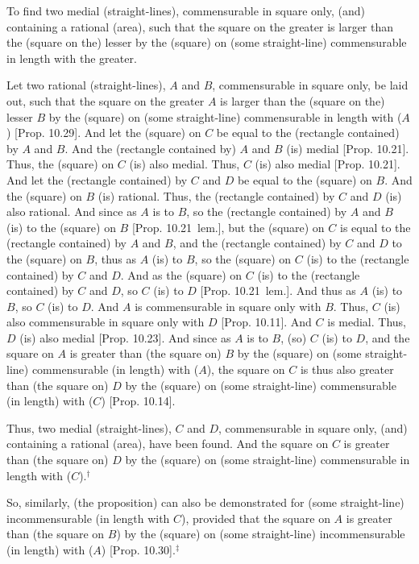 \begin{Parallel}{}{}
{To find two medial (straight-lines),
commensurable in square only, (and) containing a rational (area), such that
the square on the greater is larger than the (square on the) lesser by the
(square) on (some straight-line) commensurable in length with the greater.

\epsfysize=1.6in
\centerline{}

Let two rational (straight-lines), $A$ and $B$, commensurable in square only, 
be laid out, such that the square on the greater $A$ is larger than the (square on
the) lesser $B$ by the (square) on (some straight-line) commensurable
in length with ($A$) [Prop. 10.29]. And let the
(square) on $C$ be equal to the (rectangle contained) by $A$ and $B$.
And the (rectangle contained by) $A$ and $B$ (is) medial [Prop. 10.21]. Thus, the (square) on $C$ (is)
also medial. Thus, $C$ (is) also medial [Prop. 10.21]. And let the (rectangle contained) by $C$ and $D$
be equal to the (square) on $B$. And the (square)
on $B$ (is) rational. Thus, the (rectangle contained) by $C$ and $D$ (is)
also rational. And since as $A$ is to $B$, so the (rectangle contained) by
$A$ and $B$ (is) to the (square) on $B$ [Prop. 10.21~lem.], but the (square) on $C$
is equal to the (rectangle contained) by $A$ and $B$,  
and the (rectangle contained) by $C$ and $D$ to the (square) on
$B$, thus as $A$ (is) to $B$,
so the (square) on $C$ (is) to the (rectangle contained) by $C$ and $D$.
And as the (square) on $C$ (is) to the (rectangle contained) by $C$ and $D$,
so $C$ (is) to $D$ [Prop. 10.21~lem.].
And thus as $A$ (is) to $B$, so $C$ (is) to $D$. And $A$ is commensurable
in square only with $B$. Thus, $C$ (is) also commensurable in square
only with $D$ [Prop. 10.11]. And $C$ is medial.
Thus, $D$ (is) also medial [Prop. 10.23]. 
And since as $A$ is to $B$, (so) $C$ (is) to $D$, and the square on $A$
is greater than (the square on) $B$ by the (square) on (some straight-line)
commensurable (in length) with ($A$), the square on $C$
is thus also greater than (the square on) $D$ by the (square) on (some straight-line)
commensurable (in length) with ($C$) [Prop. 10.14]. 

Thus, two medial (straight-lines), $C$ and $D$, 
commensurable in square only, (and) containing a rational (area), have been found. And the square on $C$ is greater than (the square on) $D$ by the
(square) on (some straight-line) commensurable in length with ($C$).$^\dag$

So, similarly, (the proposition) can also be demonstrated for  (some straight-line) incommensurable
(in length with $C$), provided that the square on $A$ is greater than (the square on $B$) by the (square) on (some straight-line) incommensurable (in length) with ($A$) [Prop. 10.30].$^\ddag$}
\end{Parallel}


